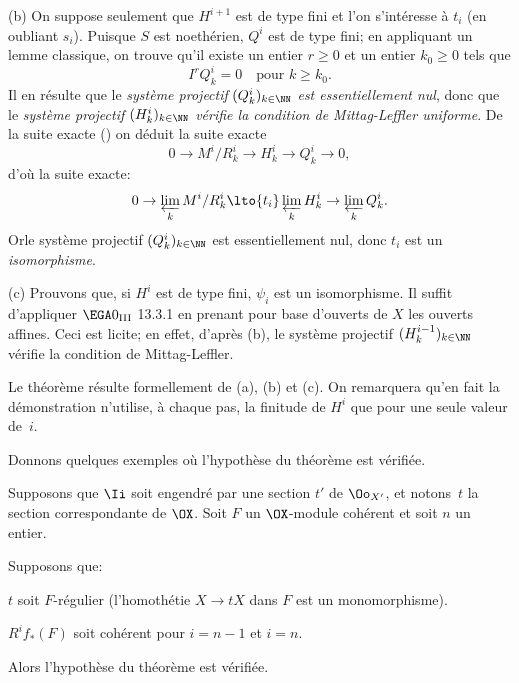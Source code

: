 \textup{(b)} \label{stepb} On suppose seulement que $H^{i+1}$ est de type fini et l'on s'int\'eresse \`a $t_i$ (en oubliant $s_i$). Puisque $S$ est noeth\'erien, $Q^i$ est de type fini; en appliquant un lemme classique, on trouve qu'il existe un entier $r\geq 0$ et un entier $k_0\geq 0$ tels que
\begin{equation} \label{eq:IX.1.26}
I^rQ_k^i=0 \quad \text{pour } k\geq k_0.
\end{equation}
Il en r\'esulte que le \emph{syst\`eme projectif} $(Q_k^i)_{k\in \NN}$ \emph{est essentiellement nul}, donc que le \emph{syst\`eme projectif $(H_k^i)_{k\in \NN}$ v\'erifie la condition de Mittag-Leffler uniforme}. De la suite exacte () on d\'eduit la suite exacte
\begin{equation} \label{eq:IX.1.27}
0 \to M^i/R_k^i \to H^i_k \to Q_k^i \to 0,
\end{equation}
d'o\`u la suite exacte:
\begin{equation} \label{eq:IX.1.28}
0\to\varprojlim_{k}M^i/R_k^i \lto{t_i} \varprojlim_{k}H^i_k \to \varprojlim_{k} Q_k^i.
\end{equation}
Or\pageoriginale le syst\`eme projectif $(Q_k^i)_{k\in \NN}$ est essentiellement nul, donc $t_i$ est un \emph{isomorphisme}.

\indent\textup{(c)} Prouvons que, si $H^i$ est de type fini, $\psi_i$ est un isomorphisme. Il suffit d'appliquer $\EGA 0_{\textup{III}}$ 13.3.1 en prenant pour base d'ouverts de $X$ les ouverts affines. Ceci est licite; en effet, d'apr\`es (b), le syst\`eme projectif $(H_k^{i-1})_{k\in \NN}$ v\'erifie la condition de Mittag-Leffler.

Le th\'eor\`eme r\'esulte formellement de (a), (b) et (c). On remarquera qu'en fait la d\'emonstration n'utilise, \`a chaque pas, la finitude de $H^i$ que pour une seule valeur de~$i$.

Donnons quelques exemples o\`u l'hypoth\`ese du th\'eor\`eme  est v\'erifi\'ee.

\begin{corollaire}\setcounter {equation}{28} \label{IX.1.2}
Supposons que $\Ii$ soit engendr\'e par une section $t'$ de $\Oo_{X'}$, et notons~$t$ la section correspondante de $\OX$. Soit $F$ un $\OX$-module coh\'erent et soit $n$ un entier.

Supposons que:
\begin{enumeratei}
\item
$t$ soit $F$-r\'egulier (\ie l'homoth\'etie $X\to tX$ dans $F$ est un monomorphisme).
\item
$R^if_*(F)$ soit coh\'erent pour $i=n-1$ et $i=n$.
\end{enumeratei}
Alors l'hypoth\`ese du th\'eor\`eme  est v\'erifi\'ee.
\end{corollaire}

